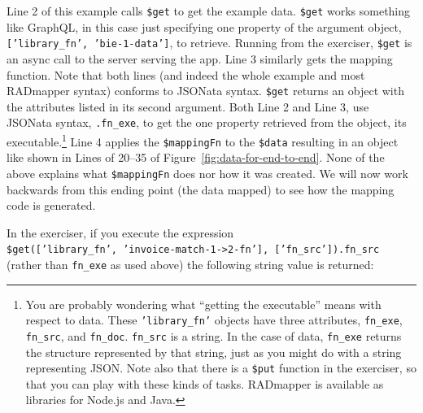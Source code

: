 \documentclass[10pt,letterpaper]{article} %
\newcommand{\stt}[1]{\texttt{#1}} %
\begin{document}
Line 2 of this example calls \stt{\$get} to get the example data.
\stt{\$get} works something like GraphQL, in this case just specifying one property of the argument object, \stt{['library\_fn', 'bie-1-data']}, to retrieve.
Running from the exerciser, \stt{\$get} is an async call to the server serving the app.
Line 3 similarly gets the mapping function. Note that both lines (and indeed the whole example and most RADmapper syntax) conforms to JSONata syntax.
\stt{\$get} returns an object with the attributes listed in its second argument.
Both Line 2 and Line 3, use JSONata syntax, \stt{.fn\_exe}, to get the one property retrieved from the object, its executable.\footnote{You are probably wondering what ``getting the executable'' means with respect to  data.
  These \stt{'library\_fn'} objects have three attributes, \stt{fn\_exe}, \stt{fn\_src}, and \stt{fn\_doc}.
  \stt{fn\_src} is a string.
  In the case of data, \stt{fn\_exe} returns the structure represented by that string, just as you might do with a string representing JSON.
  Note also that there is a \stt{\$put} function in the exerciser, so that you can play with these kinds of tasks.
  RADmapper is available as libraries for Node.js and Java.}
Line 4 applies the \stt{\$mappingFn} to the \stt{\$data} resulting in an object like shown in Lines of 20--35 of Figure~\ref{fig:data-for-end-to-end}.
None of the above explains what \stt{\$mappingFn} does nor how it was created.
We will now work backwards from this ending point (the data mapped) to see how the mapping code is generated.

In the exerciser, if you execute the expression\\ \stt{\$get(['library\_fn', 'invoice-match-1->2-fn'], ['fn\_src']).fn\_src}\\
(rather than \stt{fn\_exe} as used above)
the following string value is returned:
\end{document}
